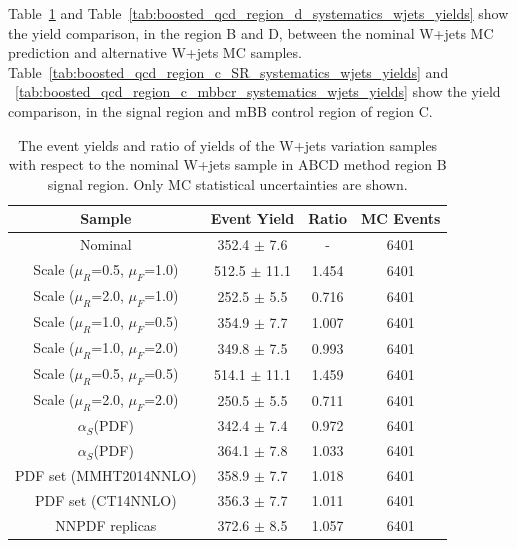 %
%
Table~\ref{tab:boosted_qcd_region_b_systematics_wjets_yields} and Table~\ref{tab:boosted_qcd_region_d_systematics_wjets_yields} 
show the yield comparison, in the region B and D, between the nominal W+jets MC prediction
and alternative W+jets MC samples. Table~\ref{tab:boosted_qcd_region_c_SR_systematics_wjets_yields}
and ~\ref{tab:boosted_qcd_region_c_mbbcr_systematics_wjets_yields} show the yield comparison, in the signal region and mBB control 
region of region C.
%
%
\begin{table}[htbp!]
\begin{center}
\begin{tabular}{c|c|c||c}
Sample     & Event Yield & Ratio & MC Events \\ 
\hline
Nominal                              &  352.4 $\pm$ 7.6  & -      &  6401 \\
Scale ($\mu_{R}$=0.5, $\mu_{F}$=1.0) &  512.5 $\pm$ 11.1 & 1.454  &  6401 \\
Scale ($\mu_{R}$=2.0, $\mu_{F}$=1.0) &  252.5 $\pm$ 5.5  & 0.716  &  6401 \\
Scale ($\mu_{R}$=1.0, $\mu_{F}$=0.5) &  354.9 $\pm$ 7.7  & 1.007  &  6401 \\
Scale ($\mu_{R}$=1.0, $\mu_{F}$=2.0) &  349.8 $\pm$ 7.5  & 0.993  &  6401 \\
Scale ($\mu_{R}$=0.5, $\mu_{F}$=0.5) &  514.1 $\pm$ 11.1 & 1.459  &  6401 \\
Scale ($\mu_{R}$=2.0, $\mu_{F}$=2.0) &  250.5 $\pm$ 5.5  & 0.711  &  6401 \\
$\alpha_{S}$(PDF)                    &  342.4 $\pm$ 7.4  & 0.972  &  6401 \\
$\alpha_{S}$(PDF)                    &  364.1 $\pm$ 7.8  & 1.033  &  6401 \\
PDF set (MMHT2014NNLO)               &  358.9 $\pm$ 7.7  & 1.018  &  6401 \\
PDF set (CT14NNLO)                   &  356.3 $\pm$ 7.7  & 1.011  &  6401 \\
NNPDF replicas                       &  372.6 $\pm$ 8.5  & 1.057  &  6401 \\
\end{tabular}
\end{center}
\caption{The event yields and ratio of yields of the W+jets variation samples
with respect to the nominal W+jets sample in ABCD method region B signal region. 
Only MC statistical uncertainties are shown.} 
\label{tab:boosted_qcd_region_b_systematics_wjets_yields}
\end{table}
